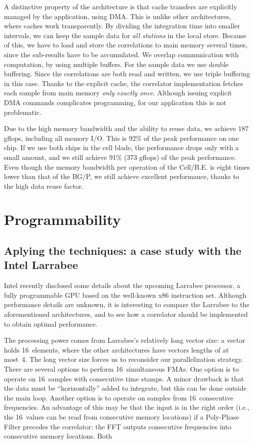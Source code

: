 \documentclass{article}
\begin{document}
A distinctive property of the architecture is that cache transfers are
explicitly managed by the application, using DMA. This is unlike other 
architectures, where caches work transparently.
By dividing the
integration time into smaller intervals, we can keep the sample data
for \emph{all stations} in the local store.  
Because of this, we have to load and store the correlations to main
memory several times, since the sub-results have to
be accumulated.  
We overlap communication with computation, by using multiple buffers.
For the sample data we use double buffering.
Since the correlations are both read and written, we use triple buffering in this case.
Thanks to the explicit cache,
the correlator implementation fetches each sample from main memory
\emph{only exactly once}. 
Although issuing explicit DMA commands complicates programming,
for our application this is not problematic.

Due to the high
memory bandwidth and the ability to reuse data, we achieve 187
gflops, including all memory I/O. This is 92\% of the peak
performance on one chip.  If we use both chips in the cell blade, the
performance drops only with a small amount, and we still achieve
91\% (373 gflops) of the peak performance.  Even though the memory
bandwidth per operation of the \mbox{Cell/B.E.} is eight times lower than
that of the BG/P, we still achieve excellent performance, thanks to
the high data reuse factor.



\section{Programmability}


\subsection{Aplying the techniques: a case study with the Intel Larrabee}

Intel recently disclosed some details about the upcoming Larrabee processor,
a fully programmable GPU based on the well-known x86 instruction set.
Although performance details are unknown, it is interesting to compare the
Larrabee to the aforementioned architectures, and to see how a correlator
should be implemented to obtain optimal performance.

The processing power comes from Larrabee's relatively long vector size:
a vector holds 16~elements, where the other architectures have vectors lengths
of at most~4.
The long vector size forces us to reconsider our parallelization strategy.
There are several options to perform 16~simultaneous FMAs.
One option is to operate on 16~samples with consecutive time stamps.
A minor drawback is that the data must be ``horizontally'' added to integrate,
but this can be done outside the main loop.
Another option is to operate on samples from 16~consecutive frequencies.
An advantage of this may be that the input is in the right order (i.e.,
the 16~values can be read from consecutive memory locations) if a Poly-Phase
Filter precedes the correlator: the FFT outputs consecutive frequencies into
consecutive memory locations.
Both 
\end{document}
